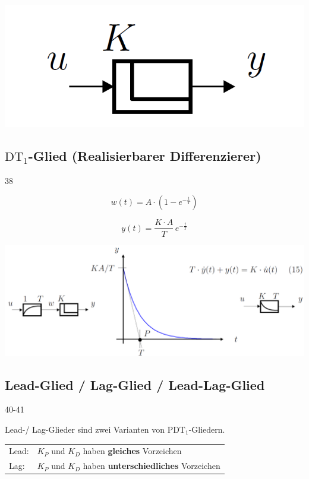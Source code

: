 \hfill
\begin{minipage}{0.25\columnwidth}
    \includegraphics[width=0.9\columnwidth]{images/D-glied_symbol}
\end{minipage}


\subsection{$\text{DT}_1$-Glied (Realisierbarer Differenzierer)}{38}

\begin{minipage}{0.48\columnwidth}  
    $$ \boxed{ w(t) = A \cdot (1 - e^{-\frac{t}{T}}) } $$
\end{minipage}
\hfill
\begin{minipage}{0.48\columnwidth}
    $$ \boxed{ y(t) = \frac{K \cdot A}{T} \,  e^{-\frac{t}{T}} } $$
\end{minipage}

\includegraphics[width=\columnwidth]{images/DT1-glied}


\subsection{Lead-Glied / Lag-Glied / Lead-Lag-Glied}{40-41}

Lead-/ Lag-Glieder sind zwei Varianten von $\text{PDT}_1$-Gliedern. 

\begin{tabular}{ll}
    Lead:   & $K_P$ und $K_D$ haben \textbf{gleiches} Vorzeichen \\
    Lag:    & $K_P$ und $K_D$ haben \textbf{unterschiedliches} Vorzeichen \\
\end{tabular}

